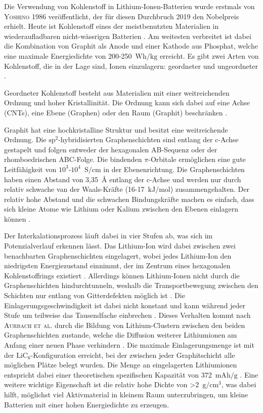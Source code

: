 Die Verwendung von Kohlenstoff in Lithium-Ionen-Batterien wurde erstmals von \textsc{Yoshino} \cite{Yoshino1986} 1986 veröffentlicht, der für diesen Durchbruch 2019 den Nobelpreis erhielt.
Heute ist Kohlenstoff eines der meistbenutzten Materialien in wiederaufladbaren nicht-wässrigen Batterien \cite{Ahmad2021}. Am weitesten verbreitet ist dabei die Kombination von Graphit als Anode und einer Kathode aus Phosphat, welche eine maximale Energiedichte von 200-250~$\si{\watt \hour \per \kg}$ erreicht. 
Es gibt zwei Arten von Kohlenstoff, die in der Lage sind, Ionen einzulagern: geordneter und ungeordneter \cite{Ghosh2024}.

Geordneter Kohlenstoff besteht aus Materialien mit einer weitreichenden Ordnung und hoher Kristallinität. Die Ordnung kann sich dabei auf eine Achse (CNTs), eine Ebene (Graphen) oder den Raum (Graphit) beschränken \cite{Wang2021}.

Graphit hat eine hochkristalline Struktur und besitzt eine weitreichende Ordnung. Die $\text{sp}^\text{2}$-hybridisierten Graphenschichten sind entlang der c-Achse gestapelt und folgen entweder der hexagonalen AB-Sequenz oder der rhomboedrischen ABC-Folge. Die bindenden $\pi$-Orbitale ermöglichen eine gute Leitfähigkeit von $10^3$-$10^4$~$\si{\siemens \per \cm}$ in der Ebenenrichtung. Die Graphenschichten haben einen Abstand von 3,35~$\si{\angstrom}$ entlang der c-Achse und werden nur durch relativ schwache van der Waals-Kräfte (16-17~$\si{\kJ \per \mol}$) zusammengehalten. Der relativ hohe Abstand und die schwachen Bindungskräfte machen es einfach, dass sich kleine Atome wie Lithium oder Kalium zwischen den Ebenen einlagern können \cite{Wang2021}.

Der Interkalationsprozess läuft dabei in vier Stufen ab, was sich im Potenzialverlauf erkennen lässt. Das Lithium-Ion wird dabei zwischen zwei benachbarten Graphenschichten eingelagert, wobei jedes Lithium-Ion den niedrigsten Energiezustand einnimmt, der im Zentrum eines hexagonalen Kohlenstoffrings existiert \cite{Sole2014,Weng2023}. Allerdings können Lithium-Ionen nicht durch die Graphenschichten hindurchtunneln, weshalb die Transportbewegung zwischen den Schichten nur entlang von Gitterdefekten möglich ist \cite{Nishidate2005}. Die Einlagerungsgeschwindigkeit ist dabei nicht konstant und kann während jeder Stufe um teilweise das Tausendfache einbrechen \cite{Levi1997}. Dieses Verhalten kommt nach \textsc{Aurbach et al.} durch die Bildung von Lithium-Clustern zwischen den beiden Graphenschichten zustande, welche die Diffusion weiterer Lithiumionen am Anfang einer neuen Phase verhindern \cite{Markevich2005}. Die maximale Einlagerungsmenge ist mit der $\text{LiC}_\text{6}$-Konfiguration erreicht, bei der zwischen jeder Graphitschicht alle möglichen Plätze belegt wurden. Die Menge an eingelagerten Lithiumionen entspricht dabei einer theoretischen spezifischen Kapazität von 372~$\si{\mA \hour \per \g}$ \cite{Winter1998}. 
Eine weitere wichtige Eigenschaft ist die relativ hohe Dichte von >2~$\si{\g \per \cm \cubed}$, was dabei hilft, möglichst viel Aktivmaterial in kleinem Raum unterzubringen, um kleine Batterien mit einer hohen Energiedichte zu erzeugen.

